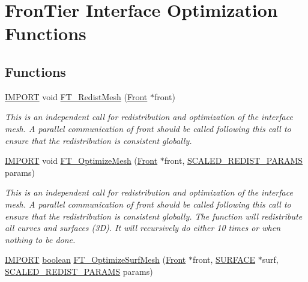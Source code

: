 \hypertarget{group___o_p_t_i_m_i_z_a_t_i_o_n}{}\section{Fron\+Tier Interface Optimization Functions}
\label{group___o_p_t_i_m_i_z_a_t_i_o_n}
\subsection*{Functions}
\begin{DoxyCompactItemize}
\item 
\hyperlink{cdecs_8h_a773175d74e73776d69c3e538f17de1ee}{I\+M\+P\+O\+RT} void \hyperlink{group___o_p_t_i_m_i_z_a_t_i_o_n_ga378a767ef50a2da96f44719ac4789f71}{F\+T\+\_\+\+Redist\+Mesh} (\hyperlink{fdecs_8h_ac32202b798f848095c489cfd04c4ca5f}{Front} $\ast$front)
\begin{DoxyCompactList}\small\item\em This is an independent call for redistribution and optimization of the interface mesh. A parallel communication of front should be called following this call to ensure that the redistribution is consistent globally. \end{DoxyCompactList}\item 
\hyperlink{cdecs_8h_a773175d74e73776d69c3e538f17de1ee}{I\+M\+P\+O\+RT} void \hyperlink{group___o_p_t_i_m_i_z_a_t_i_o_n_ga3d878dcf2802c64619bf0f524e002f61}{F\+T\+\_\+\+Optimize\+Mesh} (\hyperlink{fdecs_8h_ac32202b798f848095c489cfd04c4ca5f}{Front} $\ast$front, \hyperlink{int_8h_a02cf0c2d24dc56fb5019b39d817aa801}{S\+C\+A\+L\+E\+D\+\_\+\+R\+E\+D\+I\+S\+T\+\_\+\+P\+A\+R\+A\+MS} params)
\begin{DoxyCompactList}\small\item\em This is an independent call for redistribution and optimization of the interface mesh. A parallel communication of front should be called following this call to ensure that the redistribution is consistent globally. The function will redistribute all curves and surfaces (3D). It will recursively do either 10 times or when nothing to be done. \end{DoxyCompactList}\item 
\hyperlink{cdecs_8h_a773175d74e73776d69c3e538f17de1ee}{I\+M\+P\+O\+RT} \hyperlink{cdecs_8h_ad048433382a936258fb49e2ec4f148e1}{boolean} \hyperlink{group___o_p_t_i_m_i_z_a_t_i_o_n_ga8b3cdb7ef9b0e6e8acd1ab613c10d5c4}{F\+T\+\_\+\+Optimize\+Surf\+Mesh} (\hyperlink{fdecs_8h_ac32202b798f848095c489cfd04c4ca5f}{Front} $\ast$front, \hyperlink{int_8h_a1520d8870b5eafd76bd401aecb121ffd}{S\+U\+R\+F\+A\+CE} $\ast$surf, \hyperlink{int_8h_a02cf0c2d24dc56fb5019b39d817aa801}{S\+C\+A\+L\+E\+D\+\_\+\+R\+E\+D\+I\+S\+T\+\_\+\+P\+A\+R\+A\+MS} params)

\end{DoxyCompactItemize}
